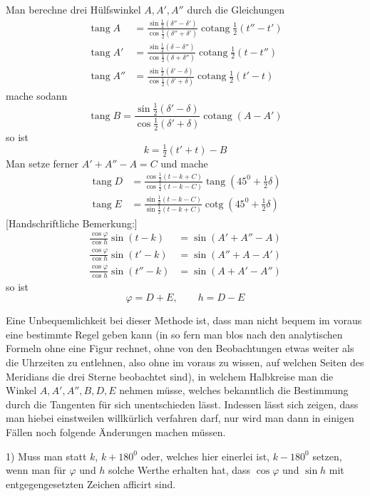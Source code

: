 Man berechne drei Hülfswinkel $A,A',A''$ durch die Gleichungen
%
\[
\begin{aligned}
\operatorname{tang}A&=\frac{\sin\frac12(\delta''-\delta')}{\cos\frac12(\delta''+\delta')}\operatorname{cotang}\tfrac12(t''-t')\\
\operatorname{tang}A'&=\frac{\sin\frac12(\delta-\delta'')}{\cos\frac12(\delta+\delta'')}\operatorname{cotang}\tfrac12(t-t'')\\
\operatorname{tang}A''&=\frac{\sin\frac12(\delta'-\delta)}{\cos\frac12(\delta'+\delta)}\operatorname{cotang}\tfrac12(t'-t)
\end{aligned}
\]
mache sodann
\[
\operatorname{tang}B=\frac{\sin\frac12(\delta'-\delta)}{\cos\frac12(\delta'+\delta)}\operatorname{cotang}(A-A')
\]
so ist
\[
k=\tfrac12(t'+t)-B
\]
Man setze ferner $A'+A''-A=C$ und mache
\[
\begin{aligned}
\operatorname{tang}D&=\frac{\cos\frac12(t-k+C)}{\cos\frac12(t-k-C)}\operatorname{tang}(45^0+\tfrac12\delta)\\
\operatorname{tang}E&=\frac{\sin\frac12(t-k-C)}{\sin\frac12(t-k+C)}\operatorname{cotg}(45^0+\tfrac12\delta)
\end{aligned}
\]
\expandafter\def\csname HistoricalNoteText6\endcsname{[Handschriftliche Bemerkung:]
\[
\begin{aligned}
\frac{\cos\varphi}{\cos h}\sin(t-k)&=\sin(A'+A''-A)\\
\frac{\cos\varphi}{\cos h}\sin(t'-k)&=\sin(A''+A-A')\\
\frac{\cos\varphi}{\cos h}\sin(t''-k)&=\sin(A+A'-A'')
\end{aligned}
\]}
so ist
\[
\varphi=D+E,\qquad h=D-E
\]

Eine Unbequemlichkeit bei dieser Methode ist, dass man nicht bequem im voraus eine bestimmte Regel geben kann (in so fern man blos nach den analytischen Formeln ohne eine Figur rechnet, ohne von den Beobachtungen etwas weiter als die Uhrzeiten zu entlehnen, also ohne im voraus zu wissen, auf welchen Seiten des Meridians die drei Sterne beobachtet sind), in welchem Halbkreise man die Winkel $A,A',A'',B,D,E$ nehmen müsse, welches bekanntlich die Bestimmung durch die Tangenten für sich unentschieden lässt. Indessen lässt sich zeigen, dass man hiebei einstweilen willkürlich verfahren darf, nur wird man dann in einigen Fällen noch folgende Änderungen machen müssen.

1) Muss man statt $k$, $k+180^0$ oder, welches hier einerlei ist, $k-180^0$ setzen, wenn man für $\varphi$ und $h$ solche Werthe erhalten hat, dass $\cos\varphi$ und $\sin h$ mit entgegengesetzten Zeichen afficirt sind.
%

